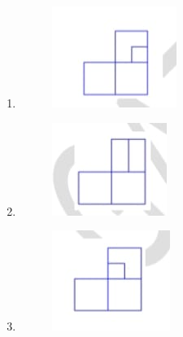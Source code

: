 \documentclass[journal,12pt,onecolumn]{article}
\theoremstyle{remark}
\begin{document}
\begin{enumerate}
    \hfill{}
    \begin{multicols}{2}
    \begin{enumerate}
    \item \begin{figure}[H]
        \centering
        \includegraphics[width=0.5\columnwidth]{figs/2Q9a.jpg}
        \caption{}
        \label{fig:q9}
    \end{figure}
    \item \begin{figure}[H]
        \centering
        \includegraphics[width=0.5\columnwidth]{figs/2Q9b.jpg}
        \caption{}
        \label{fig:q9}
    \end{figure}
    \item \begin{figure}[H]
        \centering
        \includegraphics[width=0.5\columnwidth]{figs/2Q9c.jpg}
        \caption{}
        \label{fig:q9}

\end{figure}
\end{enumerate}
\end{multicols}
\end{enumerate}
\end{document}
